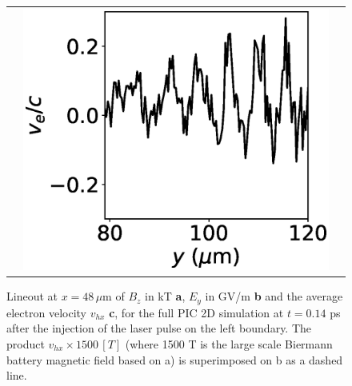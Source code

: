 \documentclass[aps,showpacs,superscriptaddress]{revtex4}
\begin{document}
\begin{figure}[ht]
{\begin{tabular}{ccc}
&\includegraphics[scale=0.4]{vecut_t104000_nat.eps}
\end{tabular}}
\caption{\label{fig:cut} 
Lineout at $x = 48\,\mu$m of   $B_z$ in kT \textbf{a}, $E_y$ in GV/m \textbf{b} and the average electron velocity $v_{hx}$ \textbf{c},  for the full PIC 2D simulation at $t=0.14$ ps after the injection of the laser pulse on the left boundary.
The product $v_{hx} \times 1500\, [T]$ (where 1500 T is the large scale Biermann battery magnetic field based on  a) is superimposed on b as a dashed line.
}
\end{figure}
\end{document}
